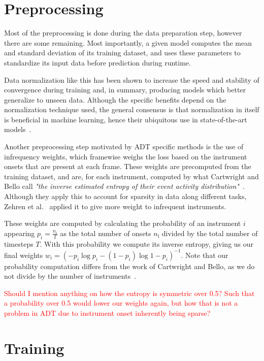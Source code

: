 \section{Preprocessing}

Most of the preprocessing is done during the data preparation step, however there are some remaining. Most importantly, a given model computes the mean and standard deviation of its training dataset, and uses these parameters to standardize its input data before prediction during runtime. 

Data normalization like this has been shown to increase the speed and stability of convergence during training and, in summary, producing models which better generalize to unseen data. Although the specific benefits depend on the normalization technique used, the general consensus is that normalization in itself is beneficial in machine learning, hence their ubiquitous use in state-of-the-art models~\cite{10056354}.

Another preprocessing step motivated by \gls{ADT} specific methods is the use of infrequency weights, which framewise weighs the loss based on the instrument onsets that are present at each frame. These weights are precomputed from the training dataset, and are, for each instrument, computed by what Cartwright and Bello call \textit{"the inverse estimated entropy of their event activity distribution"}~\cite{cartwright2018increasing}. Although they apply this to account for sparsity in data along different tasks, Zehren et al.~\cite{signals4040042} applied it to give more weight to infrequent instruments. 

These weights are computed by calculating the probability of an instrument $i$ appearing $p_i = \frac{n_i}{T}$ as the total number of onsets $n_\text{i}$ divided by the total number of timesteps $T$. With this probability we compute its inverse entropy, giving us our final weights $w_i = (-p_i\log{p_i} - (1 - p_i)\log{1 - p_i})^{-1}$. Note that our probability computation differs from the work of Cartwright and Bello, as we do not divide by the number of instruments~\cite{cartwright2018increasing}. 

\textcolor{red}{Should I mention anything on how the entropy is symmetric over 0.5? Such that a probability over 0.5 would lower our weights again, but how that is not a problem in ADT due to instrument onset inherently being sparse?}

\section{Training}

